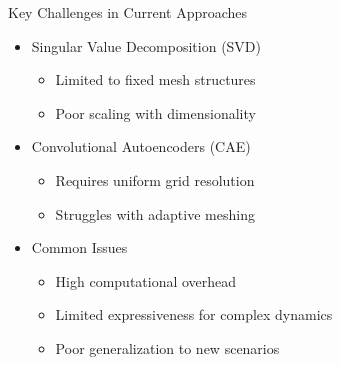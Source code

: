 \documentclass{beamer}
\begin{document}
\begin{frame}{Key Challenges in Current Approaches}
    \begin{itemize}
        \item Singular Value Decomposition (SVD)
        \begin{itemize}
            \item Limited to fixed mesh structures
            \item Poor scaling with dimensionality
        \end{itemize}
        \item Convolutional Autoencoders (CAE)
        \begin{itemize}
            \item Requires uniform grid resolution
            \item Struggles with adaptive meshing
        \end{itemize}
        \item Common Issues
        \begin{itemize}
            \item High computational overhead
            \item Limited expressiveness for complex dynamics
            \item Poor generalization to new scenarios
        \end{itemize}
    \end{itemize}
\end{frame}
\end{document}
